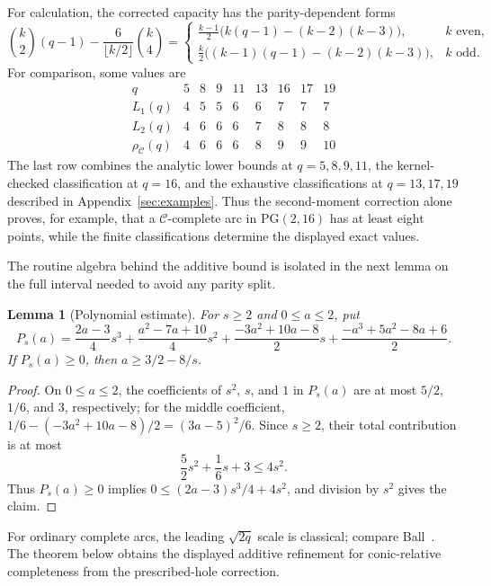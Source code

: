 \documentclass[11pt]{article}
\newtheorem{estimate}[theorem]{Lemma}
\theoremstyle{definition}
\theoremstyle{remark}
\newcommand{\PG}{\mathrm{PG}}
\newcommand{\cC}{\mathcal{C}}
\newcommand{\rhoC}{\rho_{\cC}}
\begin{document}
For calculation, the corrected capacity has the parity-dependent forms
\begin{equation}
 \binom{k}{2}(q-1)-\frac{6}{\lfloor k/2\rfloor}\binom{k}{4}
 =
 \begin{cases}
 \displaystyle
 \frac{k-1}{2}\bigl(k(q-1)-(k-2)(k-3)\bigr),&k\text{ even},\\[6pt]
 \displaystyle
 \frac{k}{2}\bigl((k-1)(q-1)-(k-2)(k-3)\bigr),&k\text{ odd}.
 \end{cases}
\label{eq:parity-capacity}
\end{equation}
For comparison, some values are
\[
\begin{array}{c|rrrrrrrr}
q&5&8&9&11&13&16&17&19\\ \hline
L_1(q)&4&5&5&6&6&7&7&7\\
L_2(q)&4&6&6&6&7&8&8&8\\
\rhoC(q)&4&6&6&6&8&9&9&10
\end{array}
\]
The last row combines the analytic lower bounds at $q=5,8,9,11$, the
kernel-checked classification at $q=16$, and the exhaustive classifications
at $q=13,17,19$ described in Appendix~\ref{sec:examples}.  Thus the
second-moment correction alone proves, for example, that a
$\cC$-complete arc in $\PG(2,16)$ has at least eight points, while the
finite classifications determine the displayed exact values.

The routine algebra behind the additive bound is isolated in the next lemma
on the full interval needed to avoid any parity split.

\begin{estimate}[Polynomial estimate]
\label{lem:polynomial-estimate}
For $s\ge2$ and $0\le a\le2$, put
\[
 P_s(a)=
 \frac{2a-3}{4}s^3
 +\frac{a^2-7a+10}{4}s^2
 +\frac{-3a^2+10a-8}{2}s
 +\frac{-a^3+5a^2-8a+6}{2}.
\]
If $P_s(a)\ge0$, then $a\ge3/2-8/s$.
\end{estimate}

\begin{proof}
On $0\le a\le2$, the coefficients of $s^2$, $s$, and $1$ in $P_s(a)$
are at most $5/2$, $1/6$, and $3$, respectively; for the middle coefficient,
\(1/6-(-3a^2+10a-8)/2=(3a-5)^2/6\).  Since $s\ge2$, their total
contribution is at most
\[
 \frac52s^2+\frac16s+3\le4s^2.
\]
Thus $P_s(a)\ge0$ implies
$0\le(2a-3)s^3/4+4s^2$, and division by $s^2$ gives the claim.
\end{proof}

For ordinary complete arcs, the leading \(\sqrt{2q}\) scale is classical;
compare Ball~\cite[Theorem~3.1]{Ball1997}.  The theorem below obtains the
displayed additive refinement for conic-relative completeness from the
prescribed-hole correction.
\end{document}
